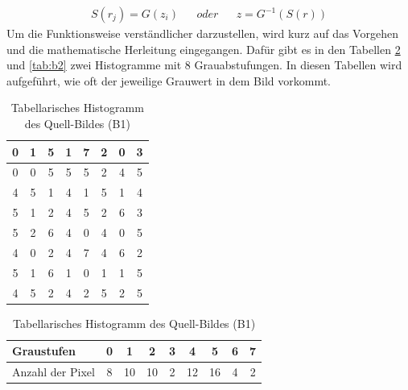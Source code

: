 \begin{align} S(r_{j})=G(z_{i})& &oder& & z=G^{-1}(S(r)) \end{align} 
Um die Funktionsweise verständlicher darzustellen, wird kurz auf das Vorgehen und die mathematische Herleitung eingegangen. Dafür gibt es in den Tabellen \ref{tab:b1} und \ref{tab:b2} zwei Histogramme mit 8 Grauabstufungen. In diesen Tabellen wird aufgeführt, wie oft der jeweilige Grauwert in dem Bild vorkommt. 
  \begin{table}[htb]
  \caption{Tabellarisches Histogramm des Quell-Bildes (B1)}
  \label{tab:b1}
  \centering
  \begin{minipage}{\textwidth}
  \center
  \begin{tabular}{|c|c|c|c|c|c|c|c|}
  \hline
  0&1&5&1&7&2&0&3\\
  \hline
  0&0&5&5&5&2&4&5\\
  \hline
  4&5&1&4&1&5&1&4\\
  \hline
  5&1&2&4&5&2&6&3\\
  \hline
  5&2&6&4&0&4&0&5\\
  \hline
  4&0&2&4&7&4&6&2\\
  \hline
  5&1&6&1&0&1&1&5\\
  \hline
  4&5&2&4&2&5&2&5\\
  \hline
  \end{tabular}
  \end{minipage}
  \begin{minipage}{\textwidth}
  \hspace{\textwidth}
  \end{minipage}
  \begin{minipage}{\textwidth}
  \center
  \begin{tabular}{|l|c|c|c|c|c|c|c|c|}
  \hline
  Graustufen & 0 & 1 & 2 & 3 & 4 & 5 & 6 & 7\\
  \hline
  Anzahl der Pixel & 8 & 10 & 10 & 2 & 12 & 16 & 4 & 2\\
  \hline
  \end{tabular}
  \end{minipage}
  \vspace{-1 cm}
  \end{table}
